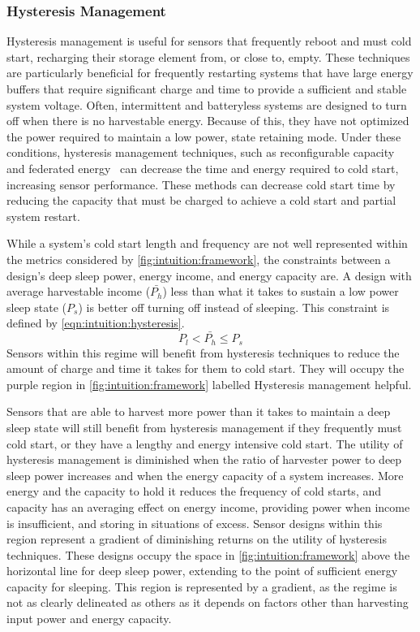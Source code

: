 \subsubsection{Hysteresis Management}
Hysteresis management is useful for sensors that frequently reboot and must cold start, recharging their storage element from, or close to, empty.
These techniques are particularly beneficial for frequently restarting systems that have large energy buffers that require significant charge and time to provide a sufficient and stable system voltage.
Often, intermittent and batteryless systems are designed to turn off when there is no harvestable energy. Because of this, they have not optimized the power required to maintain a low power, state retaining mode.
Under these conditions, hysteresis management techniques,
such as reconfigurable capacity~\cite{colinReconfigurable18} and federated energy~\cite{hesterFlicker17} can decrease the time and energy required to cold start, increasing sensor
performance.
These methods can decrease cold start time
by reducing the capacity that must be charged to achieve a cold start and partial system restart.

While a system's cold start length and frequency are not well represented within the metrics considered by \cref{fig:intuition:framework},
the constraints between a design's deep sleep power, energy income, and energy capacity are.
A design with average harvestable income ($\bar{P_h}$) less than what it takes to sustain a low power sleep state ($P_s$) is better off turning off instead of sleeping. This constraint is defined by \cref{eqn:intuition:hysteresis}.
\begin{equation}
    \label{eqn:intuition:hysteresis}
    P_l < \bar{P_h} \leq P_s
\end{equation}
Sensors within this regime will benefit from hysteresis techniques to reduce the amount of charge and time it takes for them to cold start. They will occupy the purple region in \cref{fig:intuition:framework} labelled \textsf{Hysteresis management helpful}.

Sensors that are able to harvest more power than it takes to maintain a deep sleep state will still benefit from hysteresis management if they frequently must cold start, or they have a lengthy and energy intensive cold start.
The utility of hysteresis management is diminished
when the ratio of harvester power to deep sleep power increases and when the energy capacity of a system increases.
More energy and the capacity to hold it reduces the frequency of cold starts, and capacity has an averaging effect on energy income, providing power when income is insufficient, and storing in situations of excess.
Sensor designs within this region represent a gradient of diminishing returns on the utility of hysteresis techniques.
These designs occupy the space in \cref{fig:intuition:framework} above the horizontal line for deep sleep power, extending to the point of sufficient energy capacity for sleeping.
This region is represented by a gradient, as the regime is not as clearly delineated as others as it depends on factors other than harvesting input power and energy capacity.

